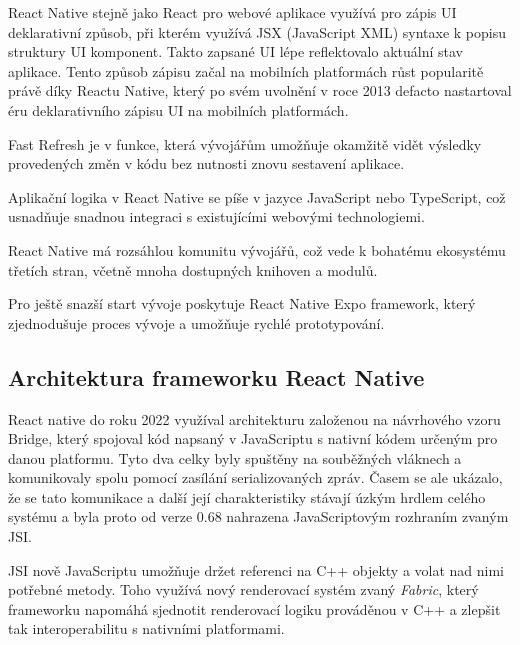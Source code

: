     
React Native stejně jako React pro webové aplikace využívá pro zápis UI deklarativní způsob, 
při kterém využívá JSX (JavaScript XML) syntaxe k popisu struktury UI komponent. \cite{reactNativeJSX}
Takto zapsané UI lépe reflektovalo aktuální stav aplikace.
Tento způsob zápisu začal na mobilních platformách růst popularitě právě díky Reactu Native, který po svém uvolnění v roce 2013 
defacto nastartoval éru deklarativního zápisu UI na mobilních platformách. \cite{declarativeUIHistory}

Fast Refresh je v funkce, která vývojářům umožňuje okamžitě vidět výsledky provedených 
změn v kódu bez nutnosti znovu sestavení aplikace. \cite{reactNativeFastRefresh}

Aplikační logika v React Native se píše v jazyce JavaScript nebo TypeScript, 
což usnadňuje snadnou integraci s existujícími webovými technologiemi. \cite{reactNativeFundamentals}

React Native má rozsáhlou komunitu vývojářů, což vede k bohatému ekosystému 
třetích stran, včetně mnoha dostupných knihoven a modulů. \cite{reactNativeComunity}

Pro ještě snazší start vývoje poskytuje React Native Expo framework, který 
zjednodušuje proces vývoje a umožňuje rychlé prototypování. \cite{reactNativeExpo}

\subsection*{Architektura frameworku React Native}

React native do roku 2022 využíval architekturu založenou na návrhového vzoru Bridge, který spojoval kód napsaný v JavaScriptu s nativní kódem určeným pro danou platformu. 
Tyto dva celky byly spuštěny na souběžných vláknech a komunikovaly spolu pomocí zasílání serializovaných zpráv. Časem se ale ukázalo, že se tato komunikace
a další její charakteristiky stávají úzkým hrdlem celého systému a byla proto od verze 0.68 nahrazena JavaScriptovým rozhraním zvaným JSI. \cite{reactNativeAboutNewArch}

JSI nově JavaScriptu umožňuje držet referenci na C++ objekty a volat nad nimi potřebné metody. \cite{reactNativeAboutNewArch} Toho využívá nový renderovací systém zvaný \textit{Fabric}, který 
frameworku napomáhá sjednotit renderovací logiku prováděnou v C++ a zlepšit tak interoperabilitu s nativními platformami.

